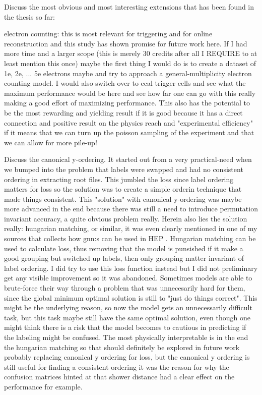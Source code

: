Discuss the most obvious and most interesting extensions that has been found in the thesis so far: 

electron counting: this is most relevant for triggering and for online reconstruction and this study has shown promise for future work here. If I had more time and a larger scope (this is merely 30 credits after all I REQUIRE to at least mention this once) maybe the first thing I would do is to create a dataset of 1e, 2e, ... 5e electrons maybe and try to approach a general-multiplicity electron counting model. I would also switch over to ecal trigger cells and see what the maximum performance would be here and see how far one can go with this really making a good effort of maximizing performance. This also has the potential to be the most rewarding and yielding result if it is good because it has a direct connection and positive result on the physics reach and "experimental efficiency" if it means that we can turn up the poisson sampling of the experiment and that we can allow for more pile-up! 

Discuss the canonical y-ordering. It started out from a very practical-need when we bumped into the problem that labels were swapped and had no consistent ordering in extracting root files. This jumbled the loss since label ordering matters for loss so the solution was to create a simple orderin technique that made things consistent. This "solution" with canonical y-ordering was maybe more advanced in the end because there was still a need to introduce permutation invariant accuracy, a quite obvious problem really. Herein also lies the solution really: hungarian matching, or similar, it was even clearly mentioned in one of my sources that collects how gnn:s can be used in HEP \cite{duarte2020-gnn-tracking}. Hungarian matching can be used to calculate loss, thus removing that the model is punsished if it make a good grouping but switched up labels, then only grouping matter invariant of label ordering. I did try to use this loss function instead but I did not preliminary get any visible improvement so it was abandoned. Sometimes models are able to brute-force their way through a problem that was unnecesarily hard for them, since the global minimum optimal solution is still to "just do things correct". This might be the underlying reason, so now the model gets an unnecessarily difficult task, but this task maybe still have the same optimal solution, even though one might think there is a risk that the model becomes to cautious in predicting if the labeling might be confused. The most physically interpretable is in the end the hungarian matching so that should definitely be explored in future work probably replacing canonical y ordering for loss, but the canonical y ordering is still useful for finding a consistent ordering it was the reason for why the confusion matrices hinted at that shower distance had a clear effect on the performance for example. 

